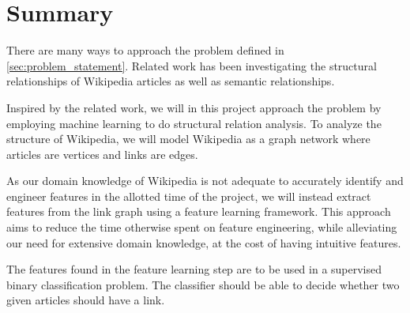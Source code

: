 \section{Summary}
There are many ways to approach the problem defined in \cref{sec:problem_statement}. Related work has been investigating the structural relationships of Wikipedia articles as well as semantic relationships.

Inspired by the related work, we will in this project approach the problem by employing machine learning to do structural relation analysis. To analyze the structure of Wikipedia, we will model Wikipedia as a graph network where articles are vertices and links are edges.

As our domain knowledge of Wikipedia is not adequate to accurately identify and engineer features in the allotted time of the project, we will instead extract features from the link graph using a feature learning framework. This approach aims to reduce the time otherwise spent on feature engineering, while alleviating our need for extensive domain knowledge, at the cost of having intuitive features.

The features found in the feature learning step are to be used in a supervised binary classification problem. The classifier should be able to decide whether two given articles should have a link.









